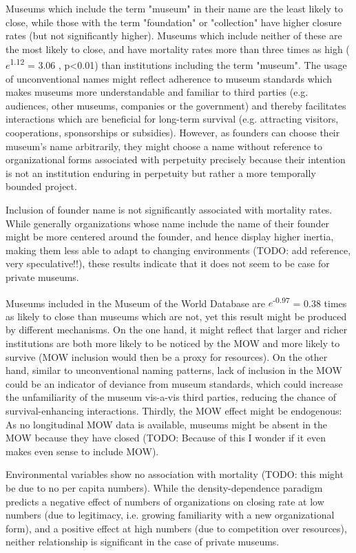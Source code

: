 \documentclass[11pt]{article}
\begin{document}
Museums which include the term "museum" in their name are the least likely to close, while those with the term "foundation" or "collection" have higher closure rates (but not significantly higher).
Museums which include neither of these are the most likely to close, and have mortality rates more than three times as high (\(e\)\textsuperscript{1.12} = 3.06 , p<0.01) than institutions including the term "museum".
The usage of unconventional names might reflect adherence to museum standards which makes museums more understandable and familiar to third parties (e.g. audiences, other museums, companies or the government) and thereby facilitates interactions which are beneficial for long-term survival (e.g. attracting visitors, cooperations, sponsorships or subsidies).
However, as founders can choose their museum’s name arbitrarily, they might choose a name without reference to organizational forms associated with perpetuity precisely because their intention is not an institution enduring in perpetuity but rather a more temporally bounded project.

Inclusion of founder name is not significantly associated with mortality rates.
While generally organizations whose name include the name of their founder might be more centered around the founder, and hence display higher inertia, making them less able to adapt to changing environments (TODO: add reference, very speculative!!), these results indicate that it does not seem to be case for private museums.


Museums included in the Museum of the World Database are \(e\)\textsuperscript{-0.97} = 0.38 times as likely to close than museums which are not, yet this result might be produced by different mechanisms.
On the one hand, it might reflect that larger and richer institutions are both more likely to be noticed by the MOW and more likely to survive (MOW inclusion would then be a proxy for resources).
On the other hand, similar to unconventional naming patterns, lack of inclusion in the MOW could be an indicator of deviance from museum standards, which could increase the unfamiliarity of the museum vis-a-vis third parties, reducing the chance of survival-enhancing interactions.
Thirdly, the MOW effect might be endogenous: As no longitudinal MOW data is available, museums might be absent in the MOW because they have closed (TODO: Because of this I wonder if it even makes even sense to include MOW).

Environmental variables show no association with mortality (TODO: this might be due to no per capita numbers).
While the density-dependence paradigm predicts a negative effect of numbers of organizations on closing rate at low numbers (due to legitimacy, i.e. growing familiarity with a new organizational form), and a positive effect at high numbers (due to competition over resources), neither relationship is significant in the case of private museums. 
\end{document}
